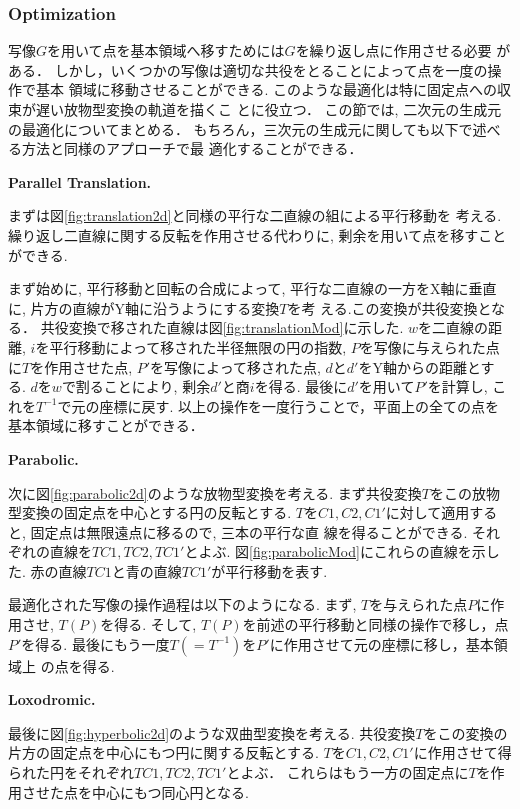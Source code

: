 \subsubsection{Optimization}

写像$G$を用いて点を基本領域へ移すためには$G$を繰り返し点に作用させる必要
がある．
しかし，いくつかの写像は適切な共役をとることによって点を一度の操作で基本
領域に移動させることができる.
このような最適化は特に固定点への収束が遅い放物型変換の軌道を描くこ
とに役立つ．
この節では, 二次元の生成元の最適化についてまとめる．
もちろん，三次元の生成元に関しても以下で述べる方法と同様のアプローチで最
適化することができる．

\noindent\textbf{Parallel Translation.}

まずは図\ref{fig:translation2d}と同様の平行な二直線の組による平行移動を
考える.
繰り返し二直線に関する反転を作用させる代わりに, 剰余を用いて点を移すこと
ができる.

まず始めに, 平行移動と回転の合成によって,
平行な二直線の一方をX軸に垂直に, 片方の直線がY軸に沿うようにする変換$T$を考
える.この変換が共役変換となる．
共役変換で移された直線は図\ref{fig:translationMod}に示した.
$w$を二直線の距離, $i$を平行移動によって移された半径無限の円の指数,
$P$を写像に与えられた点に$T$を作用させた点,
$P'$を写像によって移された点, $d$と$d'$をY軸からの距離とする.
$d$を$w$で割ることにより, 剰余$d'$と商$i$を得る.
最後に$d'$を用いて$P'$を計算し, これを$T^{-1}$で元の座標に戻す.
以上の操作を一度行うことで，平面上の全ての点を基本領域に移すことができる．

\noindent\textbf{Parabolic.}

次に図\ref{fig:parabolic2d}のような放物型変換を考える.
まず共役変換$T$をこの放物型変換の固定点を中心とする円の反転とする.
$T$を$C1,C2,C1'$に対して適用すると, 固定点は無限遠点に移るので, 三本の平行な直
線を得ることができる.
それぞれの直線を$TC1, TC2, TC1'$とよぶ.
図\ref{fig:parabolicMod}にこれらの直線を示した.
赤の直線$TC1$と青の直線$TC1'$が平行移動を表す.

最適化された写像の操作過程は以下のようになる.
まず, $T$を与えられた点$P$に作用させ, $T(P)$を得る.
そして, $T(P)$を前述の平行移動と同様の操作で移し，点$P'$を得る.
最後にもう一度$T(= T^{-1})$を$P'$に作用させて元の座標に移し，基本領域上
の点を得る.

\noindent\textbf{Loxodromic.}

最後に図\ref{fig:hyperbolic2d}のような双曲型変換を考える.
共役変換$T$をこの変換の片方の固定点を中心にもつ円に関する反転とする.
$T$を$C1, C2, C1'$に作用させて得られた円をそれぞれ$TC1, TC2, TC1'$とよぶ．
これらはもう一方の固定点に$T$を作用させた点を中心にもつ同心円となる.

